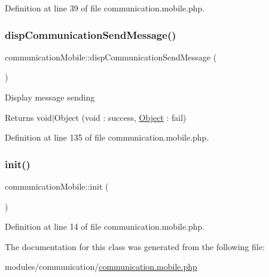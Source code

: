 Definition at line 39 of file communication.\+mobile.\+php.

\mbox{\label{classcommunicationMobile_adb243fe0a373f12d98d472a895e41d7a}} 
\subsubsection{\texorpdfstring{disp\+Communication\+Send\+Message()}{dispCommunicationSendMessage()}}
{\footnotesize\ttfamily communication\+Mobile\+::disp\+Communication\+Send\+Message (\begin{DoxyParamCaption}{ }\end{DoxyParamCaption})}

Display message sending \begin{DoxyReturn}{Returns}
void$\vert$\+Object (void \+: success, \hyperlink{classObject}{Object} \+: fail) 
\end{DoxyReturn}


Definition at line 135 of file communication.\+mobile.\+php.

\mbox{\label{classcommunicationMobile_a3fc9dd0a130e004c1fb5895ac6d4c920}} 
\subsubsection{\texorpdfstring{init()}{init()}}
{\footnotesize\ttfamily communication\+Mobile\+::init (\begin{DoxyParamCaption}{ }\end{DoxyParamCaption})}



Definition at line 14 of file communication.\+mobile.\+php.



The documentation for this class was generated from the following file\+:\begin{DoxyCompactItemize}
\item 
modules/communication/\hyperlink{communication_8mobile_8php}{communication.\+mobile.\+php}\end{DoxyCompactItemize}
